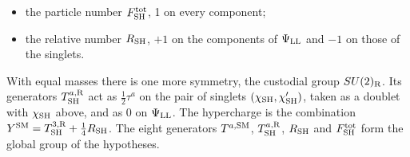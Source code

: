 \documentclass[
  10pt,
]{article}
\providecommand{\tightlist}{%
  \setlength{\itemsep}{0pt}\setlength{\parskip}{0pt}}
\begin{document}
\begin{itemize}
\tightlist
\item
  the particle number \(F^{\rm tot}_{\rm SH}\), 1 on every component;
\item
  the relative number \(R_{\rm SH}\), \(+1\) on the components of
  \(\Psi_{\rm LL}\) and \(-1\) on those of the singlets.
\end{itemize}

With equal masses there is one more symmetry, the custodial group
\(SU(2)_{\rm R}\). Its generators \(T^{a,{\rm R}}_{\rm SH}\) act as
\(\tfrac12\tau^a\) on the pair of singlets
\((\chi_{\rm SH},\chi'_{\rm SH})\), taken as a doublet with
\(\chi_{\rm SH}\) above, and as 0 on \(\Psi_{\rm LL}\). The hypercharge
is the combination
\(Y^{\rm SM}=T^{3,{\rm R}}_{\rm SH}+\tfrac14R_{\rm SH}\). The eight
generators \(T^{a,{\rm SM}}\), \(T^{a,{\rm R}}_{\rm SH}\),
\(R_{\rm SH}\) and \(F^{\rm tot}_{\rm SH}\) form the global group of the
hypotheses.
\end{document}
